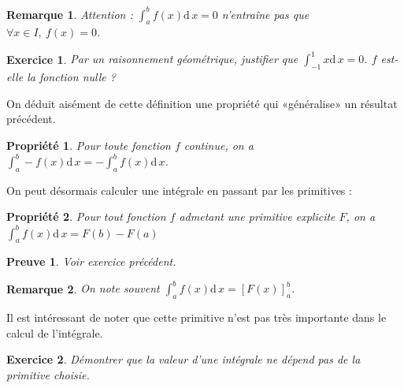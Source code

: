 \documentclass[11pt,a4paper,french]{article}
\newcommand{\diff}[1]{\mathrm{d}\,#1}
\theoremstyle{break}
\newtheorem{propriete}{Propriété}
\theoremstyle{plain}
\newtheorem{exerciceT}{Exercice}
\theoremstyle{nonumberplain}
\newtheorem{remarque}{Remarque}
\newtheorem{preuve}{Preuve}
\theoremstyle{nonumberbreak}
\newenvironment{exercice}{\begin{framed}\begin{exerciceT}}{\end{exerciceT}\end{framed}}
\begin{document}
\begin{remarque}
  Attention : $\int_a^bf(x) \diff{x} = 0$ n'entraîne pas que $\forall x
  \in I,\ f(x) = 0$.
\end{remarque}

\begin{exercice}
  Par un raisonnement géométrique, justifier que
  $\int_{-1}^1x\diff{x} = 0$. $f$ est-elle la fonction nulle ?
\end{exercice}

On déduit aisément de cette définition une propriété qui «généralise» un
résultat précédent.

\begin{propriete}
  Pour toute fonction $f$ continue, on a $\int_a^b -f(x)\diff{x} =
  -\int_a^b f(x)\diff{x}$.
\end{propriete}

On peut désormais calculer une intégrale en passant par les primitives :
\begin{propriete}
  Pour tout fonction $f$ admetant une primitive explicite $F$, on a
  $\int_a^bf(x)\diff{x} = F(b) - F(a)$
\end{propriete}
\begin{preuve}
  Voir exercice précédent.
\end{preuve}

\begin{remarque}
  On note souvent $\int_a^bf(x)\diff{x} = \left[ F(x) \right]_a^b$.
\end{remarque}

Il est intéressant de noter que cette primitive n'est pas très
importante dans le calcul de l'intégrale.

\begin{exercice}
  Démontrer que la valeur d'une intégrale ne dépend pas de la primitive
  choisie.
\end{exercice}
\end{document}
